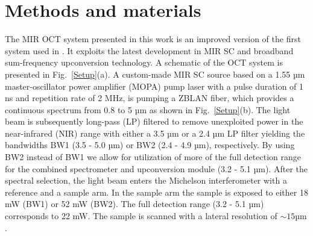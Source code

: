 \documentclass[9pt,twocolumn]{extarticle}
\begin{document}
\section{Methods and materials}
The MIR OCT system presented in this work is an improved version of the first system used in \cite{israelsen2019real}. It exploits the latest development in MIR SC and broadband sum-frequency upconversion technology. A schematic of the OCT system is presented in Fig.~\ref{Setup}(a). A custom-made MIR SC source based on a 1.55 µm master-oscillator power amplifier (MOPA) pump laser with a pulse duration of 1 ns and repetition rate of 2 MHz, is pumping a ZBLAN fiber, which provides a continuous spectrum from 0.8 to 5 µm 
as shown in Fig.~\ref{Setup}(b). 
The light beam is subsequently long-pass (LP) filtered to remove unexploited power in the near-infrared (NIR) range with either a 3.5 µm or a 2.4 µm LP filter yielding the bandwidths BW1 (3.5 - 5.0 µm) or BW2 (2.4 - 4.9 µm), respectively. By using BW2 instead of BW1
we allow for utilization of more of the full detection range for the combined spectrometer and upconversion module (3.2 - 5.1 µm). After the spectral selection, the light beam enters the Michelson interferometer with a reference and a sample arm. 
In the sample arm the sample is exposed to either 18 mW (BW1) or 52 mW (BW2). The full detection range (3.2 - 5.1 µm) corresponds to 22 mW. The sample is scanned with a lateral resolution of $\sim 15$µm \cite{israelsen2019real}.
\end{document}
